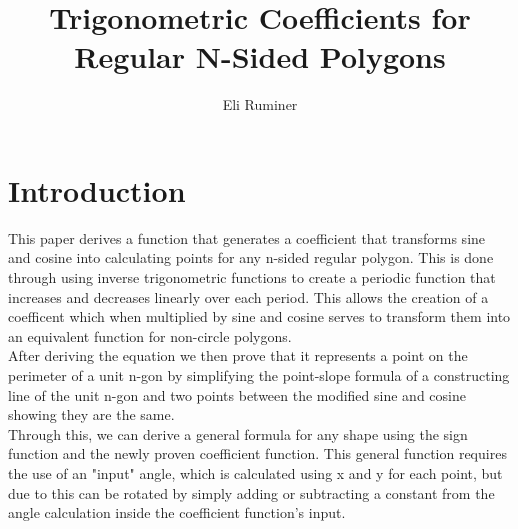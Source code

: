 \documentclass[11pt]{article}
\title{Trigonometric Coefficients for Regular N-Sided Polygons}
\author{Eli Ruminer}
\date{}
\begin{document}
\begin{titlepage}
\clearpage\maketitle
\thispagestyle{empty}
\end{titlepage}

\tableofcontents
\newpage

\section{Introduction}
This paper derives a function that generates a coefficient that transforms sine and cosine into calculating points for any n-sided regular polygon. This is done through using inverse trigonometric functions to create a periodic function that increases and decreases linearly over each period. This allows the creation of a coefficent which when multiplied by sine and cosine serves to transform them into an equivalent function for non-circle polygons.\\
 After deriving the equation we then prove that it represents a point on the perimeter of a unit n-gon by simplifying the point-slope formula of a constructing line of the unit n-gon and two points between the modified sine and cosine showing they are the same. \\
Through this, we can derive a general formula for any shape using the sign function and the newly proven coefficient function. This general function requires the use of an "input" angle, which is calculated using x and y for each point, but due to this can be rotated by simply adding or subtracting a constant from the angle calculation inside the coefficient function's input.
\end{document}
